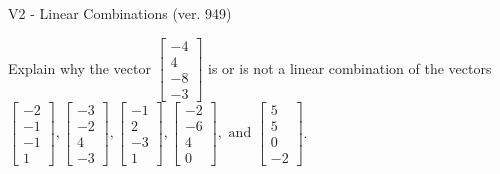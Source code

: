 \begin{exercise}
  \begin{exerciseTitle}V2 - Linear Combinations (ver. 949)\end{exerciseTitle}
  \begin{exerciseStatement}
    Explain why the vector \(\left[\begin{array}{c}
-4 \\
4 \\
-8 \\
-3
\end{array}\right]\)  is or is not a linear 
	combination of the vectors \(\left[\begin{array}{c}
-2 \\
-1 \\
-1 \\
1
\end{array}\right] , \left[\begin{array}{c}
-3 \\
-2 \\
4 \\
-3
\end{array}\right] , \left[\begin{array}{c}
-1 \\
2 \\
-3 \\
1
\end{array}\right] , \left[\begin{array}{c}
-2 \\
-6 \\
4 \\
0
\end{array}\right] , \text{ and } \left[\begin{array}{c}
5 \\
5 \\
0 \\
-2
\end{array}\right]\).
	



\end{exerciseStatement}
\end{exercise}
